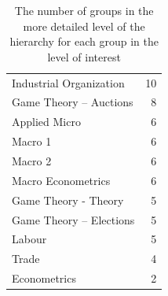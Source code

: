 \begin{table}[tb]
\caption[Subgroups]{The number of groups in the more detailed level of the hierarchy for each group in the level of interest}
\label{tab:subgroups}
\begin{tabular}{lr}
\toprule
\midrule
Industrial Organization & 10 \\
Game Theory – Auctions & 8 \\
Applied Micro & 6 \\
Macro 1 & 6 \\
Macro 2 & 6 \\
Macro Econometrics & 6 \\
Game Theory -  Theory & 5 \\
Game Theory – Elections & 5 \\
Labour & 5 \\
Trade & 4 \\
Econometrics & 2 \\
\bottomrule
\end{tabular}
\end{table}
